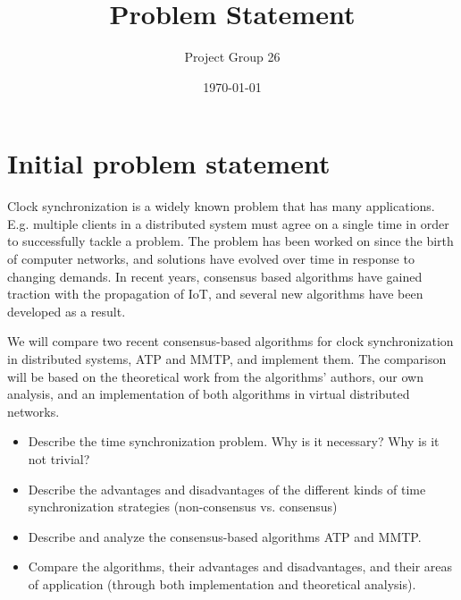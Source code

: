 \documentclass{article}
\title{Problem Statement}
\author{Project Group 26}
\date{\today}
\begin{document}
\maketitle

\section{Initial problem statement}

Clock synchronization is a widely known problem that has many applications. E.g. multiple clients in a distributed system must agree on a single time in order to successfully tackle a problem. The problem has been worked on since the birth of computer networks, and solutions have evolved over time in response to changing demands. In recent years, consensus based algorithms have gained traction with the propagation of IoT, and several new algorithms have been developed as a result.

We will compare two recent consensus-based algorithms for clock synchronization in distributed systems, ATP and MMTP, and implement them. The comparison will be based on the theoretical work from the algorithms' authors, our own analysis, and an implementation of both algorithms in virtual distributed networks.

\begin{itemize}
    \item Describe the time synchronization problem. Why is it necessary? Why is it not trivial? 
    \item Describe the advantages and disadvantages of the different kinds of time synchronization strategies (non-consensus vs. consensus)
    \item Describe and analyze the consensus-based algorithms ATP and MMTP.
    \item Compare the algorithms, their advantages and disadvantages, and their areas of application (through both implementation and theoretical analysis).
\end{itemize}
\end{document}
